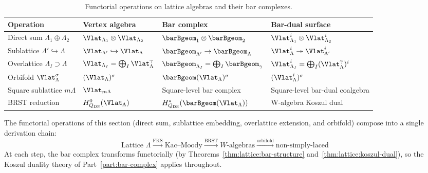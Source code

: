 \begin{table}[ht]
\centering
\caption{Functorial operations on lattice algebras and their bar complexes.}
\label{tab:lattice:bar-operations}
\begin{tabular}{l l l l}
\textbf{Operation} & \textbf{Vertex algebra} & \textbf{Bar complex} & \textbf{Bar-dual surface} \\
\hline
Direct sum $\Lambda_1 \oplus \Lambda_2$
 & $\Vlat_{\Lambda_1} \otimes \Vlat_{\Lambda_2}$
 & $\barBgeom_1 \otimes \barBgeom_2$
 & $\Vlat_{\Lambda_1}^i \otimes \Vlat_{\Lambda_2}^i$ \\[3pt]
Sublattice $\Lambda' \hookrightarrow \Lambda$
 & $\Vlat_{\Lambda'} \hookrightarrow \Vlat_\Lambda$
 & $\barBgeom_{\Lambda'} \to \barBgeom_\Lambda$
 & $\Vlat_\Lambda^i \twoheadrightarrow \Vlat_{\Lambda'}^i$ \\[3pt]
Overlattice $\Lambda_I \supset \Lambda$
 & $\Vlat_{\Lambda_I} = \bigoplus_{I} \Vlat_\Lambda^\gamma$
 & $\barBgeom_{\Lambda_I} = \bigoplus_{I} \barBgeom_\gamma$
 & $\Vlat_{\Lambda_I}^i = \bigoplus_{I} (\Vlat_\Lambda^\gamma)^i$ \\[3pt]
Orbifold $\Vlat_\Lambda^\sigma$
 & $(\Vlat_\Lambda)^\sigma$
 & $\barBgeom(\Vlat_\Lambda)^\sigma$
 & $(\Vlat_\Lambda^i)^\sigma$ \\[3pt]
Square sublattice $m\Lambda$
 & $\Vlat_{m\Lambda}$
 & Square-level bar complex
 & Square-level bar-dual coalgebra \\[3pt]
BRST reduction
 & $H^0_{Q_{\mathrm{DS}}}(\Vlat_\Lambda)$
 & $H^*_{Q_{\mathrm{DS}}}(\barBgeom(\Vlat_\Lambda))$
 & W-algebra Koszul dual
\end{tabular}
\end{table}

\begin{remark}\label{rem:lattice:derivation-chain}
The functorial operations of this section (direct sum, sublattice
embedding, overlattice extension, and orbifold) compose into a
single derivation chain:
\[
\text{Lattice } \Lambda
\xrightarrow{\text{FKS}}
\text{Kac--Moody}
\xrightarrow{\text{BRST}}
\text{$W$-algebras}
\xrightarrow{\text{orbifold}}
\text{non-simply-laced}
\]
At each step, the bar complex transforms functorially (by
Theorems~\ref{thm:lattice:bar-structure}
and~\ref{thm:lattice:koszul-dual}), so the Koszul duality theory
of Part~\ref{part:bar-complex} applies throughout.
\end{remark}



